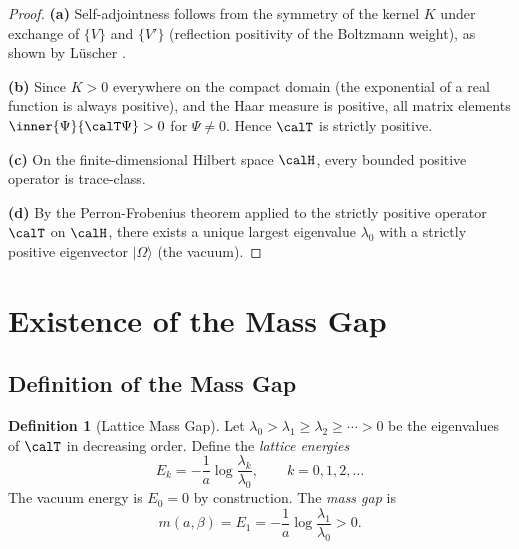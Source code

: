 \documentclass[12pt, a4paper]{article}
\theoremstyle{plain}
\theoremstyle{definition}
\newtheorem{definition}[theorem]{Definition}
\begin{document}
\begin{proof}
  \textbf{(a)} Self-adjointness follows from the symmetry of the kernel $K$
  under exchange of $\{V\}$ and $\{V'\}$ (reflection positivity of the
  Boltzmann weight), as shown by L\"uscher \citep{Luscher1977}.

  \textbf{(b)} Since $K > 0$ everywhere on the compact domain (the
  exponential of a real function is always positive), and the Haar measure
  is positive, all matrix elements $\inner{\Psi}{\calT\Psi} > 0$ for
  $\Psi \neq 0$. Hence $\calT$ is strictly positive.

  \textbf{(c)} On the finite-dimensional Hilbert space $\calH$, every
  bounded positive operator is trace-class.

  \textbf{(d)} By the Perron-Frobenius theorem applied to the strictly
  positive operator $\calT$ on $\calH$, there exists a unique largest
  eigenvalue $\lambda_0$ with a strictly positive eigenvector
  $|\Omega\rangle$ (the vacuum).
\end{proof}

\section{Existence of the Mass Gap}\label{sec:massgap}

\subsection{Definition of the Mass Gap}

\begin{definition}[Lattice Mass Gap]\label{def:massgap}
  Let $\lambda_0 > \lambda_1 \geq \lambda_2 \geq \cdots > 0$ be the
  eigenvalues of $\calT$ in decreasing order. Define the \emph{lattice
  energies}
  \begin{equation}
    E_k = -\frac{1}{a} \log \frac{\lambda_k}{\lambda_0}, \qquad k = 0, 1, 2, \ldots
  \end{equation}
  The vacuum energy is $E_0 = 0$ by construction. The \emph{mass gap} is
  \begin{equation}\label{eq:massgap_def}
    m(a, \beta) = E_1 = -\frac{1}{a} \log \frac{\lambda_1}{\lambda_0} > 0.
  \end{equation}
\end{definition}
\end{document}
